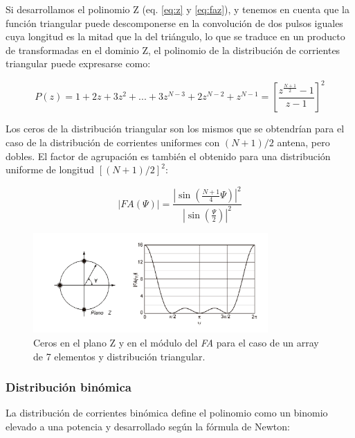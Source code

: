 \par Si desarrollamos el polinomio Z (eq. \ref{eq:z} y \ref{eq:faz}), y tenemos en cuenta que la función triangular puede descomponerse en la convolución de dos pulsos iguales cuya longitud es la mitad que la del triángulo, lo que se traduce en un producto de transformadas en el dominio Z, el polinomio de la distribución de corrientes triangular puede expresarse como: 

\begin{equation}
	P(z)=1+2z+3z^{2}+...+3z^{N-3}+2z^{N-2}+z^{N-1}=\left [ \frac{z^{\frac{N+1}{2}}-1}{z-1} \right ]^{2}
	\label{eq:casotriangpoli}
\end{equation}

\par Los ceros de la distribución triangular son los mismos que se obtendrían para el caso de la distribución de corrientes uniformes con $(N+1)/2$ antena, pero dobles. El factor de agrupación es también el obtenido para una distribución uniforme de longitud $[(N+1)/2]^{2}$: 

\begin{equation}
	\left | FA (\Psi) \right |=\frac{\left |  \sin\left ( \frac{N+1}{4}\Psi \right )\right |^{2}}{\left | \sin\left ( \frac{\Psi}{2} \right ) \right |^{2}}
	\label{eq:fa2}
\end{equation}

\begin{figure}[h]
    \centering
        \includegraphics[width=0.8\textwidth]{archivos/array/triangular}
        \caption{Ceros en el plano Z y en el módulo del \textit{FA} para el caso de un array de 7 elementos y distribución triangular. \citep{Cardama2002}}
        \label{fig:cerostrinagular}
\end{figure}

\subsubsection{Distribución binómica}
\par La distribución de corrientes binómica define el polinomio como un binomio elevado a una potencia y desarrollado según la fórmula de Newton: 


